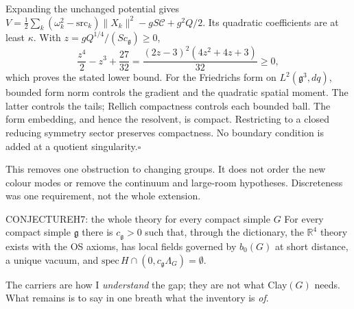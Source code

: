 Expanding the unchanged potential gives
$V=\tfrac12\sum_k(\omega_k^2-\mathrm{src}_k)\|X_k\|^2-gS\mathcal C+g^2Q/2$.
Its quadratic coefficients are at least $\kappa$. With $z=gQ^{1/4}/(Sc_{\mathfrak g})\ge0$,
\[
\frac{z^4}{2}-z^3+\frac{27}{32}
=\frac{(2z-3)^2(4z^2+4z+3)}{32}\ge0,
\]
which proves the stated lower bound. For the Friedrichs form on
$L^2(\mathfrak g^3,dq)$, bounded form norm controls the gradient and the quadratic spatial moment.
The latter controls the tails; Rellich compactness controls each bounded ball. The form embedding,
and hence the resolvent, is compact. Restricting to a closed reducing symmetry sector preserves compactness.
No boundary condition is added at a quotient singularity.\hfill$\square$

This removes one obstruction to changing groups. It does not order the new colour modes or remove the
continuum and large-room hypotheses. Discreteness was one requirement, not the whole extension.

\begin{claim}{CONJECTURE}{H7: the whole theory for every compact simple $G$}\label{b:h7}
For every compact simple $\mathfrak g$ there is $c_{\mathfrak g}>0$ such that, through the dictionary, the $\mathbb R^4$
theory exists with the OS axioms, has local fields governed by $b_0(G)$ at short distance, a unique vacuum, and
$\mathrm{spec}\,H\cap(0,c_{\mathfrak g}\Lambda_G)=\emptyset$.
\end{claim}

The carriers are how I \emph{understand} the gap; they are not what Clay$(G)$ needs. What remains is to say in one
breath what the inventory is \emph{of}.
